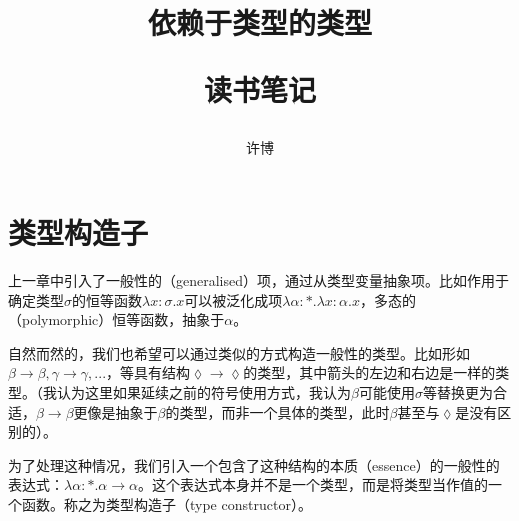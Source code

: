 \documentclass[UTF8]{article}
\title{依赖于类型的类型\\[2ex]\begin{large}读书笔记\end{large}}
\author{许博}
\date{}
\begin{document}
\maketitle
	\section{类型构造子}
		上一章中引入了一般性的（generalised）项，通过从类型变量抽象项。比如作用于确定类型$\sigma$的恒等函数$\lambda x:\sigma.x$可以被泛化成项$\lambda\alpha:*.\lambda x:\alpha.x$，多态的（polymorphic）恒等函数，抽象于$\alpha$。
		
		自然而然的，我们也希望可以通过类似的方式构造一般性的类型。比如形如$\beta\rightarrow\beta,\gamma\rightarrow\gamma,...$，等具有结构$\lozenge\rightarrow\lozenge$的类型，其中箭头的左边和右边是一样的类型。（我认为这里如果延续之前的符号使用方式，我认为$\beta$可能使用$\sigma$等替换更为合适，$\beta\rightarrow\beta$更像是抽象于$\beta$的类型，而非一个具体的类型，此时$\beta$甚至与$\lozenge$是没有区别的）。
		
		为了处理这种情况，我们引入一个包含了这种结构的本质（essence）的一般性的表达式：$\lambda\alpha:*.\alpha\rightarrow\alpha$。这个表达式本身并不是一个类型，而是将类型当作值的一个函数。称之为类型构造子（type constructor）。
		
\end{document}
